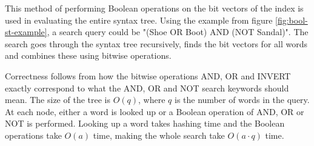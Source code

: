 This method of performing Boolean operations on the bit vectors of the index is used in evaluating the entire syntax tree. Using the example from figure \ref{fig:bool-st-example}, a search query could be "(Shoe OR Boot) AND (NOT Sandal)". The search goes through the syntax tree recursively, finds the bit vectors for all words and combines these using bitwise operations.

Correctness follows from how the bitwise operations AND, OR and INVERT exactly correspond to what the AND, OR and NOT search keywords should mean. The size of the tree is $O(q)$, where $q$ is the number of words in the query. At each node, either a word is looked up or a Boolean operation of AND, OR or NOT is performed. Looking up a word takes hashing time and the Boolean operations take $O(a)$ time, making the whole search take $O(a\cdot q)$ time. 



